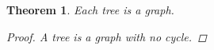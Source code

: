 \documentclass{article}
\newtheorem{theorem}{Theorem}
\begin{document}
\begin{theorem}
Each tree is a graph.
\begin{proof}
A tree is a graph with no cycle.
\end{proof}
\end{theorem}
\end{document}
